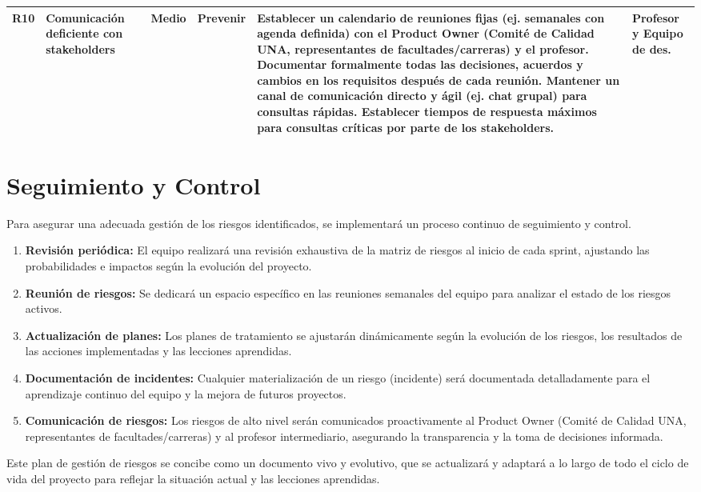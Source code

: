 \begin{longtable}{|l|p{}|l|l|p{}|p{}|}
    R10 & Comunicación deficiente con stakeholders & Medio & Prevenir & Establecer un calendario de reuniones fijas (ej. semanales con agenda definida) con el Product Owner (Comité de Calidad UNA, representantes de facultades/carreras) y el profesor. Documentar formalmente todas las decisiones, acuerdos y cambios en los requisitos después de cada reunión. Mantener un canal de comunicación directo y ágil (ej. chat grupal) para consultas rápidas. Establecer tiempos de respuesta máximos para consultas críticas por parte de los stakeholders. & Profesor y Equipo de des. \\
    \hline
\end{longtable}

\section{Seguimiento y Control}
Para asegurar una adecuada gestión de los riesgos identificados, se implementará un proceso continuo de seguimiento y control.
\begin{enumerate}
    \item \textbf{Revisión periódica:} El equipo realizará una revisión exhaustiva de la matriz de riesgos al inicio de cada sprint, ajustando las probabilidades e impactos según la evolución del proyecto.
    \item \textbf{Reunión de riesgos:} Se dedicará un espacio específico en las reuniones semanales del equipo para analizar el estado de los riesgos activos.
    \item \textbf{Actualización de planes:} Los planes de tratamiento se ajustarán dinámicamente según la evolución de los riesgos, los resultados de las acciones implementadas y las lecciones aprendidas.
    \item \textbf{Documentación de incidentes:} Cualquier materialización de un riesgo (incidente) será documentada detalladamente para el aprendizaje continuo del equipo y la mejora de futuros proyectos.
    \item \textbf{Comunicación de riesgos:} Los riesgos de alto nivel serán comunicados proactivamente al Product Owner (Comité de Calidad UNA, representantes de facultades/carreras) y al profesor intermediario, asegurando la transparencia y la toma de decisiones informada.
\end{enumerate}
Este plan de gestión de riesgos se concibe como un documento vivo y evolutivo, que se actualizará y adaptará a lo largo de todo el ciclo de vida del proyecto para reflejar la situación actual y las lecciones aprendidas.


